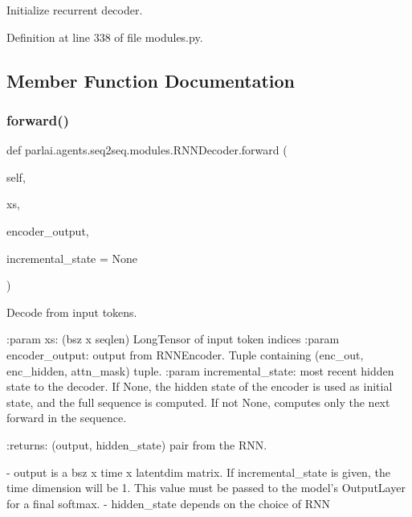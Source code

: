 \begin{DoxyVerb}Initialize recurrent decoder.\end{DoxyVerb}
 

Definition at line 338 of file modules.\+py.



\subsection{Member Function Documentation}
\mbox{\label{classparlai_1_1agents_1_1seq2seq_1_1modules_1_1RNNDecoder_a883315b7f0f57ccf17c96fc8f24ddc11}} 
\subsubsection{\texorpdfstring{forward()}{forward()}}
{\footnotesize\ttfamily def parlai.\+agents.\+seq2seq.\+modules.\+R\+N\+N\+Decoder.\+forward (\begin{DoxyParamCaption}\item[{}]{self,  }\item[{}]{xs,  }\item[{}]{encoder\+\_\+output,  }\item[{}]{incremental\+\_\+state = {\ttfamily None} }\end{DoxyParamCaption})}

\begin{DoxyVerb}Decode from input tokens.

:param xs: (bsz x seqlen) LongTensor of input token indices
:param encoder_output: output from RNNEncoder. Tuple containing
    (enc_out, enc_hidden, attn_mask) tuple.
:param incremental_state: most recent hidden state to the decoder.
    If None, the hidden state of the encoder is used as initial state,
    and the full sequence is computed. If not None, computes only the
    next forward in the sequence.

:returns: (output, hidden_state) pair from the RNN.

    - output is a bsz x time x latentdim matrix. If incremental_state is
given, the time dimension will be 1. This value must be passed to
the model's OutputLayer for a final softmax.
    - hidden_state depends on the choice of RNN
\end{DoxyVerb}
 

